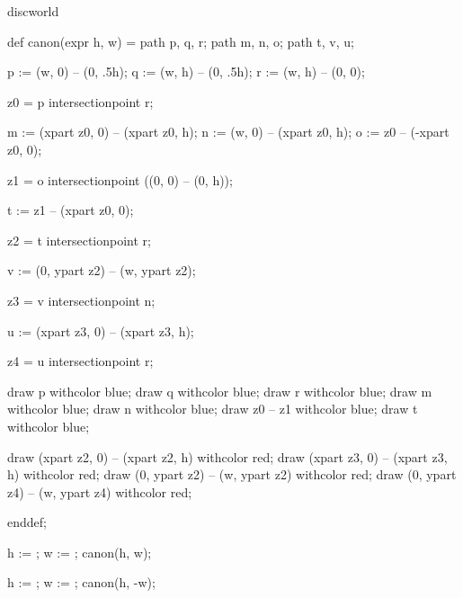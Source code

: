 

\startenvironment discworld

	\setuppagenumbering[alternative=doublesided]

	\startMPdefinitions
		def canon(expr h, w) =
			path p, q, r;
			path m, n, o;
			path t, v, u;

			p := (w,  0) -- (0, .5h); %
			q := (w,  h) -- (0, .5h); %
			r := (w,  h) -- (0, 0); %

			z0 = p intersectionpoint r; %

			m := (xpart z0, 0) -- (xpart z0, h); %
			n := (w, 0) -- (xpart z0, h); %
			o := z0 -- (-xpart z0, 0); %

			z1 = o intersectionpoint ((0, 0) -- (0, h)); %

			t := z1 -- (xpart z0, 0); %

			z2 = t intersectionpoint r; %

			v := (0, ypart z2) -- (w, ypart z2); %

			z3 = v intersectionpoint n; %

			u := (xpart z3, 0) -- (xpart z3, h); %

			z4 = u intersectionpoint r; %

			draw p withcolor blue;
			draw q withcolor blue;
			draw r withcolor blue;
			draw m withcolor blue;
			draw n withcolor blue;
			draw z0 -- z1 withcolor blue;
			draw t withcolor blue;

			draw (xpart z2, 0) -- (xpart z2, h) withcolor red;
			draw (xpart z3, 0) -- (xpart z3, h) withcolor red;
			draw (0, ypart z2) -- (w, ypart z2) withcolor red;
			draw (0, ypart z4) -- (w, ypart z4) withcolor red;


		enddef;
	\stopMPdefinitions

		h := \overlayheight;
		w := \overlaywidth;
		canon(h, w);
	\stopreusableMPgraphic

		h := \overlayheight;
		w := \overlaywidth;
		canon(h, -w);
	\stopreusableMPgraphic

